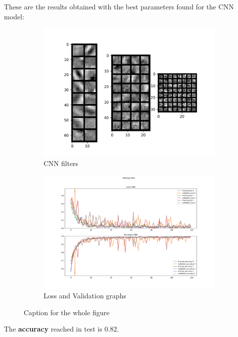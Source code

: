 \documentclass{report}
\begin{document}
These are the results obtained with the best parameters found for the CNN model:
\begin{figure}[t!]
  \centering
  \hspace{-2cm}
  \begin{subfigure}[t]{0.49\textwidth}
    \centering
    \includegraphics[width=1.3\textwidth]{3.CNN_500_sample/CNN_filters.png}
    \caption{CNN filters}
    \label{fig:image-set1-sub1}
  \end{subfigure}
  \hspace{-0.5cm}
  \begin{subfigure}[t]{0.49\textwidth}
    \centering
    \includegraphics[width=1.3\textwidth]{3.CNN_500_sample/training_infos.png}
    \caption{Loss and Validation graphs}
    \label{fig:image-set1-sub2}
  \end{subfigure}

  \caption{Caption for the whole figure}
  \label{fig:image-set1}
\end{figure}
The \textbf{accuracy} reached in test is $0.82$.\\
\end{document}
